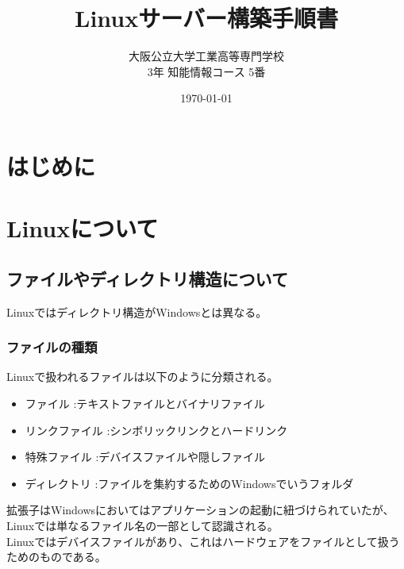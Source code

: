 \documentclass[a4paper, 11pt, dvipdfmx]{jsarticle}
\begin{document}
\title{Linuxサーバー構築手順書}
\author{大阪公立大学工業高等専門学校\\
3年 知能情報コース 5番\\
}
\date{\today}
\maketitle\thispagestyle{empty}

\newpage
\setcounter{section}{-1}

\section{はじめに}

\section{Linuxについて}
\subsection{ファイルやディレクトリ構造について}
Linuxではディレクトリ構造がWindowsとは異なる。
\subsubsection{ファイルの種類}
  Linuxで扱われるファイルは以下のように分類される。
  \begin{itemize}
    \item ファイル     :テキストファイルとバイナリファイル
    \item リンクファイル :シンボリックリンクとハードリンク
    \item 特殊ファイル  :デバイスファイルや隠しファイル
    \item ディレクトリ  :ファイルを集約するためのWindowsでいうフォルダ
  \end{itemize}
  拡張子はWindowsにおいてはアプリケーションの起動に紐づけられていたが、Linuxでは単なるファイル名の一部として認識される。\\
  Linuxではデバイスファイルがあり、これはハードウェアをファイルとして扱うためのものである。\\
\end{document}
